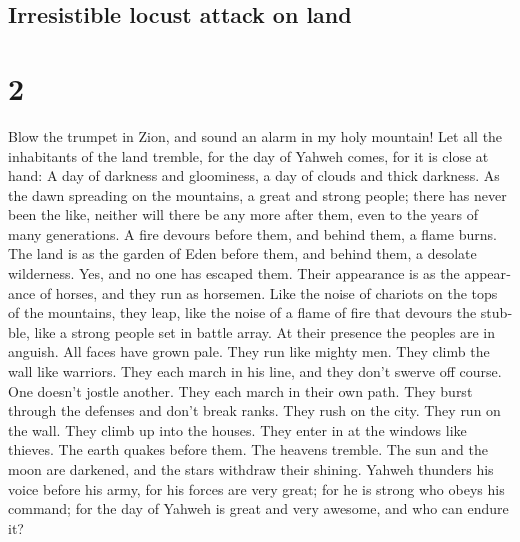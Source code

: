 \begin{paracol}{2}
\switchcolumn
\begin{otherlanguage}{english}

\hypertarget{irresistible-locust-attack-on-land}{%
\subsection{Irresistible locust attack on
land}\label{irresistible-locust-attack-on-land}}

\hypertarget{section-3}{%
\section{2}\label{section-3}}

 Blow the trumpet in Zion, and sound an alarm in my holy
mountain! Let all the inhabitants of the land tremble, for the day of
Yahweh comes, for it is close at hand:  A day of darkness
and gloominess, a day of clouds and thick darkness. As the dawn
spreading on the mountains, a great and strong people; there has never
been the like, neither will there be any more after them, even to the
years of many generations.  A fire devours before them,
and behind them, a flame burns. The land is as the garden of Eden before
them, and behind them, a desolate wilderness. Yes, and no one has
escaped them.  Their appearance is as the appearance of
horses, and they run as horsemen.  Like the noise of
chariots on the tops of the mountains, they leap, like the noise of a
flame of fire that devours the stubble, like a strong people set in
battle array.  At their presence the peoples are in
anguish. All faces have grown pale.  They run like mighty
men. They climb the wall like warriors. They each march in his line, and
they don't swerve off course.  One doesn't jostle another.
They each march in their own path. They burst through the defenses and
don't break ranks.  They rush on the city. They run on the
wall. They climb up into the houses. They enter in at the windows like
thieves.  The earth quakes before them. The heavens
tremble. The sun and the moon are darkened, and the stars withdraw their
shining.  Yahweh thunders his voice before his army, for
his forces are very great; for he is strong who obeys his command; for
the day of Yahweh is great and very awesome, and who can endure it?

\hypertarget{gods-exhortation-to-repentance-renewed-request-to-celebrate-a-day-of-penance}{%
}
\end{otherlanguage}
\end{paracol}
